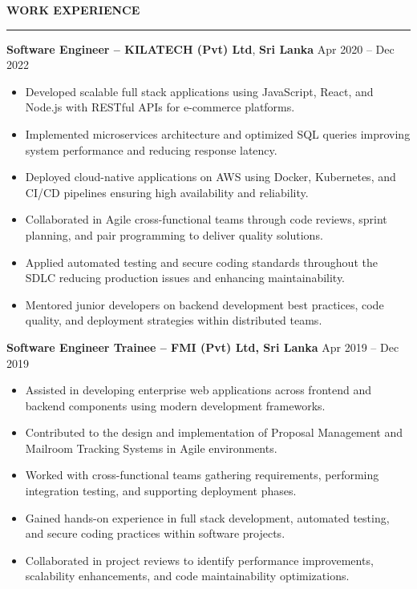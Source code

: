 \documentclass[10pt,letterpaper]{article}
\begin{document}
\vspace{8pt}

\textbf{WORK EXPERIENCE}\\[-8pt]
\noindent\rule{\textwidth}{1pt}

\vspace{-2pt}

\textbf{Software Engineer -- KILATECH (Pvt) Ltd}, \textbf{Sri Lanka} \hfill Apr 2020 -- Dec 2022

\vspace{-1pt}

\begin{itemize}
\item Developed scalable full stack applications using JavaScript, React, and Node.js with RESTful APIs for e-commerce platforms.
\item Implemented microservices architecture and optimized SQL queries improving system performance and reducing response latency.
\item Deployed cloud-native applications on AWS using Docker, Kubernetes, and CI/CD pipelines ensuring high availability and reliability.
\item Collaborated in Agile cross-functional teams through code reviews, sprint planning, and pair programming to deliver quality solutions.
\item Applied automated testing and secure coding standards throughout the SDLC reducing production issues and enhancing maintainability.
\item Mentored junior developers on backend development best practices, code quality, and deployment strategies within distributed teams.
\end{itemize}

\textbf{Software Engineer Trainee -- FMI (Pvt) Ltd, Sri Lanka} \hfill Apr 2019 -- Dec 2019

\vspace{-1pt}

\begin{itemize}
\item Assisted in developing enterprise web applications across frontend and backend components using modern development frameworks.
\item Contributed to the design and implementation of Proposal Management and Mailroom Tracking Systems in Agile environments.
\item Worked with cross-functional teams gathering requirements, performing integration testing, and supporting deployment phases.
\item Gained hands-on experience in full stack development, automated testing, and secure coding practices within software projects.
\item Collaborated in project reviews to identify performance improvements, scalability enhancements, and code maintainability optimizations.
\end{itemize}
\end{document}

